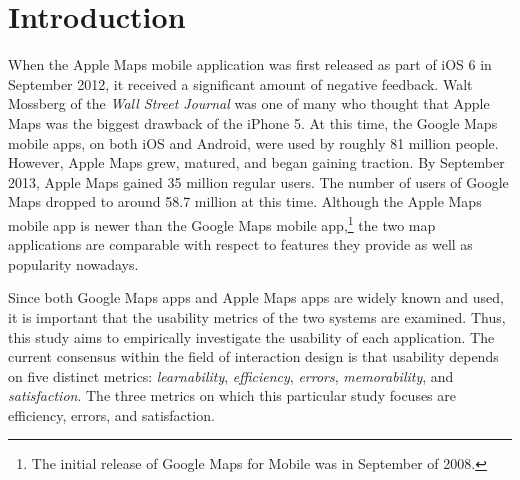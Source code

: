 \documentclass[a4paper; 11pt]{article}
\begin{document}
\section{Introduction}
When the Apple Maps mobile application was first released as part of iOS 6 in September 2012, it received a significant amount of negative feedback. Walt Mossberg of the \textit{Wall Street Journal} was one of many who thought that Apple Maps was the biggest drawback of the iPhone 5.\cite{Mossberg} At this time, the Google Maps mobile apps, on both iOS and Android, were used by roughly 81 million people.\cite{ComScore} However, Apple Maps grew, matured, and began gaining traction. By September 2013, Apple Maps gained 35 million regular users. The number of users of Google Maps dropped to around 58.7 million at this time.\cite{ComScore} Although the Apple Maps mobile app is newer than the Google Maps mobile app,\footnote{The initial release of Google Maps for Mobile was in September of 2008.} the two map applications are comparable with respect to features they provide as well as popularity nowadays.
\medskip
\par
Since both Google Maps apps and Apple Maps apps are widely known and used, it is important that the usability metrics of the two systems are examined. Thus, this study aims to empirically investigate the usability of each application. The current consensus within the field of interaction design is that usability depends on five distinct metrics: \textit{learnability}, \textit{efficiency}, \textit{errors}, \textit{memorability}, and \textit{satisfaction}.\cite{Nielsen} The three metrics on which this particular study focuses are efficiency, errors, and satisfaction.
\end{document}
